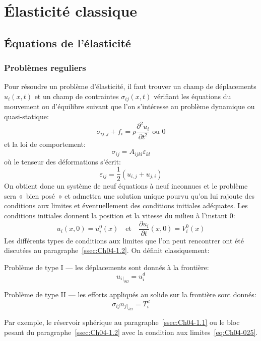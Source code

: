 \chapter{Élasticité classique} \label{chap:Ch06}
\section{Équations de l'élasticité} \label{sec:Ch06-1}
\subsection{Problèmes reguliers} \label{ssec:Ch06-1.1}
Pour résoudre un problème d'élasticité, il faut trouver un champ de déplacements $u_i\left( x,t \right)$ et un champ de contraintes $\sigma_{ij}\left( x,t \right)$ vérifiant les équations du mouvement ou d'équilibre suivant que l'on s'intéresse au problème dynamique ou quasi-statique:
\begin{equation}
    \sigma_{ij,j} + f_i = \rho \frac{\partial^2 u_i}{\partial t^2} \text{ ou } 0
    \label{eq:Ch06-001}
\end{equation}
et la loi de comportement:
\begin{equation}
    \sigma_{ij} = A_{ijkl} \varepsilon_{kl}
    \label{eq:Ch06-002}
\end{equation}
où le tenseur des déformations s'écrit:
\begin{equation}
    \varepsilon_{ij} = \frac{1}{2} \left( u_{i,j} + u_{j,i} \right)
    \label{eq:Ch06-003}
\end{equation}
On obtient donc un système de neuf équations à neuf inconnues et le problème sera «~bien posé~» et admettra une solution unique pourvu qu'on lui rajoute des conditions aux limites et éventuellement des conditions initiales adéquates.
Les conditions initiales donnent la position et la vitesse du milieu à l'instant 0:
\begin{equation}
    u_i \left( x,0 \right) = u_{i}^0 (x)\quad\text{et}\quad \frac{\partial u_i}{\partial t} \left( x,0 \right) = V_i^0 \left( x \right)
    \label{eq:Ch06-004}
\end{equation}
Les différents types de conditions aux limites que l'on peut rencontrer ont été discutées au paragraphe~\ref{ssec:Ch04-1.2}.
On définit classiquement:
\begin{description}
    \item Problème de type I --- les déplacements sont donnés à la frontière:
        \begin{equation}
            u_i{}_{|_{\partial \Omega}} = u_i^d
            \label{eq:Ch06-005}
        \end{equation}
    \item Problème de type II --- les efforts appliqués au solide sur la frontière sont donnés:
        \begin{equation}
            \sigma_{ij} n_j{}_{|_{\partial \Omega}} = T_i^d
            \label{eq:Ch06-006}
        \end{equation}
\end{description}
Par exemple, le réservoir sphérique au paragraphe~\ref{ssec:Ch04-1.1} ou le bloc pesant du paragraphe~\ref{ssec:Ch04-1.2} avec la condition aux limites~\eqref{eq:Ch04-025}.

